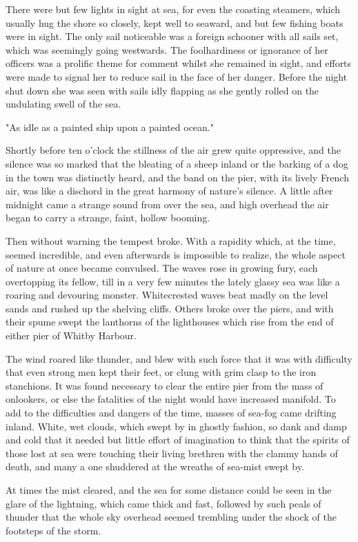 There were but few lights in sight at sea, for even the coasting steamers, which usually hug the shore so closely, kept well to seaward, and but few fishing boats were in sight. The only sail noticeable was a foreign schooner with all sails set, which was seemingly going westwards. The foolhardiness or ignorance of her officers was a prolific theme for comment whilst she remained in sight, and efforts were made to signal her to reduce sail in the face of her danger. Before the night shut down she was seen with sails idly flapping as she gently rolled on the undulating swell of the sea. 

"As idle as a painted ship upon a painted ocean." 

Shortly before ten o'clock the stillness of the air grew quite oppressive, and the silence was so marked that the bleating of a sheep inland or the barking of a dog in the town was distinctly heard, and the band on the pier, with its lively French air, was like a dischord in the great harmony of nature's silence. A little after midnight came a strange sound from over the sea, and high overhead the air began to carry a strange, faint, hollow booming. 

Then without warning the tempest broke. With a rapidity which, at the time, seemed incredible, and even afterwards is impossible to realize, the whole aspect of nature at once became convulsed. The waves rose in growing fury, each overtopping its fellow, till in a very few minutes the lately glassy sea was like a roaring and devouring monster. Whitecrested waves beat madly on the level sands and rushed up the shelving cliffs. Others broke over the piers, and with their spume swept the lanthorns of the lighthouses which rise from the end of either pier of Whitby Harbour. 

The wind roared like thunder, and blew with such force that it was with difficulty that even strong men kept their feet, or clung with grim clasp to the iron stanchions. It was found necessary to clear the entire pier from the mass of onlookers, or else the fatalities of the night would have increased manifold. To add to the difficulties and dangers of the time, masses of sea-fog came drifting inland. White, wet clouds, which swept by in ghostly fashion, so dank and damp and cold that it needed but little effort of imagination to think that the spirits of those lost at sea were touching their living brethren with the clammy hands of death, and many a one shuddered at the wreaths of sea-mist swept by. 

At times the mist cleared, and the sea for some distance could be seen in the glare of the lightning, which came thick and fast, followed by such peals of thunder that the whole sky overhead seemed trembling under the shock of the footsteps of the storm. 

